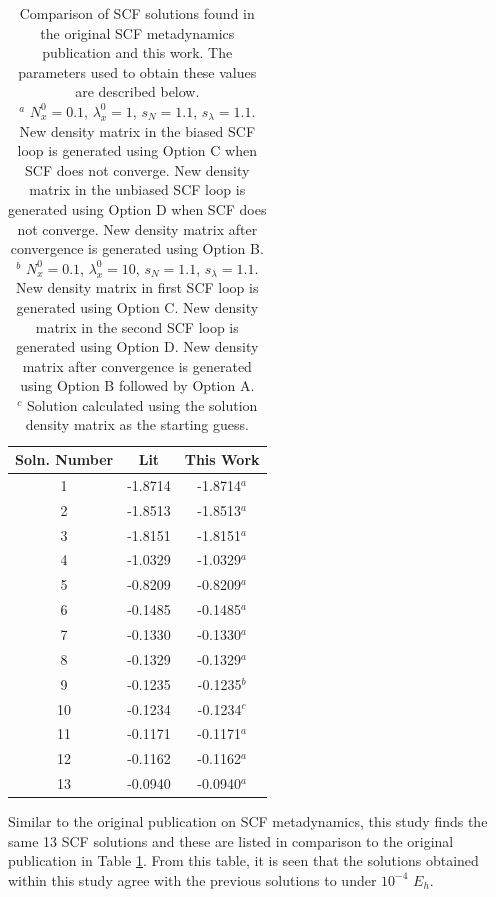 \documentclass[final,3p,times,twocolumn]{elsarticle}
\begin{document}
\begin{table}
\centering
\begin{tabular}{c|cc} \hline\hline
Soln. Number & Lit\cite{scfmd} & This Work \\ \hline
1 & -1.8714 & -1.8714$^a$ \\
2 & -1.8513 & -1.8513$^a$ \\
3 & -1.8151 & -1.8151$^a$ \\
4 & -1.0329 & -1.0329$^a$ \\
5 & -0.8209 & -0.8209$^a$ \\
6 & -0.1485 & -0.1485$^a$ \\
7 & -0.1330 & -0.1330$^a$ \\
8 & -0.1329 & -0.1329$^a$ \\
9 & -0.1235 & -0.1235$^b$ \\
10 & -0.1234 & -0.1234$^c$ \\
11 & -0.1171 & -0.1171$^a$ \\
12 & -0.1162 & -0.1162$^a$ \\
13 & -0.0940 & -0.0940$^a$ \\ \hline\hline
\end{tabular}
\caption{Comparison of SCF solutions found in the original SCF metadynamics publication\cite{scfmd} and this work. The parameters used to obtain these values are described below.\\
$^a$ $N_x^0 = 0.1$, $\lambda_x^0 = 1$, $s_N = 1.1$, $s_\lambda = 1.1$. New density matrix in the biased SCF loop is generated using Option C when SCF does not converge. New density matrix in the unbiased SCF loop is generated using Option D when SCF does not converge. New density matrix after convergence is generated using Option B.\\
$^b$ $N_x^0 = 0.1$, $\lambda_x^0 = 10$, $s_N = 1.1$, $s_\lambda = 1.1$. New density matrix in first SCF loop is generated using Option C. New density matrix in the second SCF loop is generated using Option D. New density matrix after convergence is generated using Option B followed by Option A.\\
$^c$ Solution calculated using the solution density matrix as the starting guess.}
\label{tab:h4results}
\end{table}

Similar to the original publication on SCF metadynamics,\cite{scfmd} this study finds the same 13 SCF solutions and these are listed in comparison to the original publication in Table \ref{tab:h4results}. From this table, it is seen that the solutions obtained within this study agree with the previous solutions to under $10^{-4}$ $E_h$. 
\end{document}
